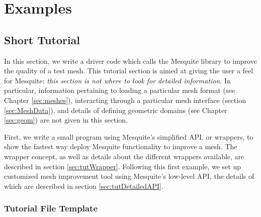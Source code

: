 \chapter{Examples} \label{sec:examples}

\section{Short Tutorial}

In this section, we write a driver code which calls the Mesquite
library to improve the quality of a test mesh. This tutorial section
is aimed at giving the user a feel for Mesquite: \emph{this section is not
where to look for detailed information}. In particular, information
pertaining to loading a particular mesh format (see Chapter \ref{sec:meshes}), 
interacting through a particular mesh interface (section \ref{sec:MeshData}), 
and details of defining geometric domains (see Chapter \ref{sec:geom}) are not
given in this section.

First, we write a small program using Mesquite's simplified API, or
wrappers, to show the fastest way deploy Mesquite functionality to
improve a mesh.  The wrapper concept, as well as details about the
different wrappers available, are described in section
\ref{sec:tutWrapper}.  Following this first example, we set up customized mesh
improvement tool using Mesquite's low-level API, the details of which
are described in section \ref{sec:tutDetailedAPI}.

\subsection{Tutorial File Template}
\label{sec:tutfile}

